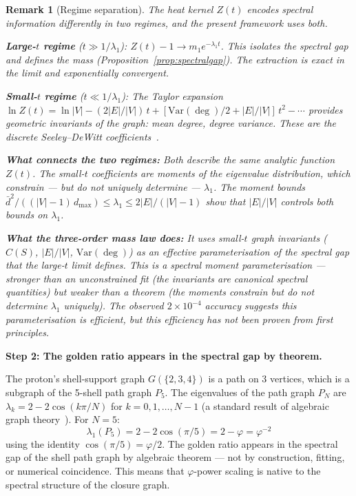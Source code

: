 \documentclass[12pt]{article}
\newtheorem{remark}[theorem]{Remark}
\newcommand{\phig}{\varphi}
\begin{document}
\begin{remark}[Regime separation]\label{rem:regimes}
The heat kernel $Z(t)$ encodes spectral information differently in two regimes, and the present framework uses both.

\textbf{Large-$t$ regime} ($t \gg 1/\lambda_1$): $Z(t) - 1 \to m_1 e^{-\lambda_1 t}$. This isolates the spectral gap and defines the mass (Proposition~\ref{prop:spectralgap}). The extraction is exact in the limit and exponentially convergent.

\textbf{Small-$t$ regime} ($t \ll 1/\lambda_1$): The Taylor expansion $\ln Z(t) = \ln|V| - (2|E|/|V|)\,t + [\mathrm{Var}(\deg)/2 + |E|/|V|]\,t^2 - \cdots$ provides geometric invariants of the graph: mean degree, degree variance. These are the discrete Seeley--DeWitt coefficients~\citep{Kac1966, Gilkey1984, Chung1997}.

\textbf{What connects the two regimes:} Both describe the same analytic function $Z(t)$. The small-$t$ coefficients are moments of the eigenvalue distribution, which constrain --- but do not uniquely determine --- $\lambda_1$. The moment bounds~\citep{Chung1997} $\bar{d}^2 / ((|V|-1)\, d_{\max}) \leq \lambda_1 \leq 2|E|/(|V|-1)$ show that $|E|/|V|$ controls both bounds on $\lambda_1$.

\textbf{What the three-order mass law does:} It uses small-$t$ graph invariants ($C(S)$, $|E|/|V|$, $\mathrm{Var}(\deg)$) as an effective parameterisation of the spectral gap that the large-$t$ limit defines. This is a spectral moment parameterisation --- stronger than an unconstrained fit (the invariants are canonical spectral quantities) but weaker than a theorem (the moments constrain but do not determine $\lambda_1$ uniquely). The observed $2 \times 10^{-4}$ accuracy suggests this parameterisation is efficient, but this efficiency has not been proven from first principles.
\end{remark}

\textbf{Step 2: The golden ratio appears in the spectral gap by theorem.}

The proton's shell-support graph $G(\{2,3,4\})$ is a path on 3 vertices, which is a subgraph of the 5-shell path graph $P_5$. The eigenvalues of the path graph $P_N$ are $\lambda_k = 2 - 2\cos(k\pi/N)$ for $k = 0, 1, \ldots, N-1$ (a standard result of algebraic graph theory~\citep{Chung1997}). For $N = 5$:
\begin{equation}\label{eq:spectralgap}
    \lambda_1(P_5) = 2 - 2\cos(\pi/5) = 2 - \phig = \phig^{-2}
\end{equation}
using the identity $\cos(\pi/5) = \phig/2$. The golden ratio appears in the spectral gap of the shell path graph by algebraic theorem --- not by construction, fitting, or numerical coincidence. This means that $\phig$-power scaling is native to the spectral structure of the closure graph.
\end{document}
